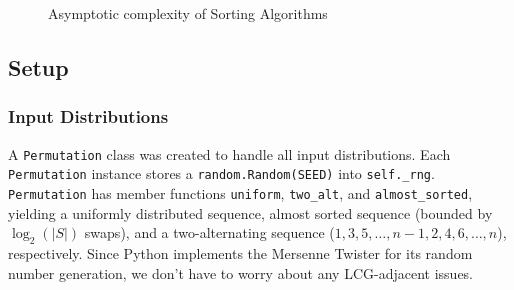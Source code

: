 \begin{figure}[ht]
	\centering
	\caption{Asymptotic complexity of Sorting Algorithms}
	\label{fig:sort-complexities}
\end{figure}

\subsection{Setup}

\subsubsection{Input Distributions}
A \texttt{Permutation} class was created to handle all input
distributions. Each \texttt{Permutation} instance stores a
\texttt{random.Random(SEED)} into \texttt{self.\_rng}.
\texttt{Permutation} has member functions \texttt{uniform}, \texttt{two\_alt},
and \texttt{almost\_sorted}, yielding a uniformly distributed sequence,
almost sorted sequence (bounded by $\log_2(|S|)$ swaps), and a
two-alternating sequence ($1, 3, 5, \dots, n-1, 2, 4, 6, \dots, n$),
respectively. Since Python implements the Mersenne Twister for its random
number generation, we don't have to worry about any LCG-adjacent issues.

